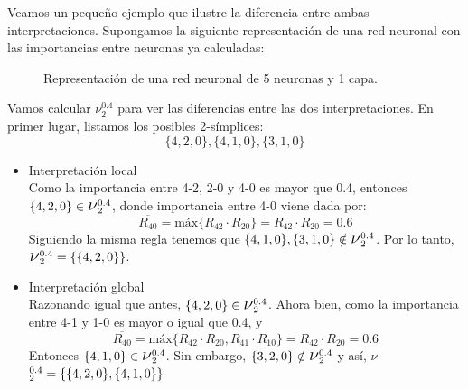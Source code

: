 \documentclass[12pt, a4paper, twoside]{book}
\numberwithin{equation}{section}
\theoremstyle{definition}
\newenvironment{ejem}
  {\pushQED{\qed}\renewcommand{\qedsymbol}{$\blacktriangleleft$}\ejemplo}
  {\popQED\endejemplo}
\theoremstyle{remark}
\theoremstyle{plain}
\begin{document}
	Veamos un pequeño ejemplo que ilustre la diferencia entre ambas 
	interpretaciones.
	\begin{ejem}
		\label{ej:int}
		Supongamos la siguiente representación de una red neuronal con 
		las importancias entre neuronas ya calculadas: 	
		\begin{figure}[H]
			\centering
			\caption{Representación de una red neuronal de 5 neuronas y 1 capa.}
		\end{figure}
		Vamos calcular {\Large $\nu$}$^{0.4}_{2}$ para ver las 
		diferencias entre las dos interpretaciones. En primer lugar, 
		listamos los posibles 2-símplices: 
		$$
		\{4,2,0\},\{4,1,0\},\{3,1,0\}
		$$
		\begin{itemize}
			\item{Interpretación local}\\
				Como la importancia entre 4-2, 2-0 y 4-0 es 
				mayor que 0.4, entonces $\{4,2,0\} \in 
				\text{{\Large $\nu$}}^{0.4}_{2}$,
				donde importancia entre 4-0 viene dada por:
				$$\overline{R_{40}}=\text{máx}\{R_{42} \cdot 
				R_{20}\}=R_{42} \cdot R_{20}=0.6$$
				Siguiendo la misma regla tenemos que 
				$\{4,1,0\},\{3,1,0\} \notin 
				\text{{\Large $\nu$}}^{0.4}_{2}$. Por lo 
				tanto,
				$\text{{\Large $\nu$}}^{0.4}_{2}=
				\{\{4,2,0\}\}$.
			\item{Interpretación global}\\
				Razonando igual que antes,$\ \{4,2,0\} \in 
				\text{{\Large $\nu$}}^{0.4}_{2}$. Ahora bien, 
				como la importancia entre 4-1 y 1-0 es mayor o 
				igual que 0.4, y 
				$$\overline{R_{40}}=\text{máx}\{R_{42} \cdot 
				R_{20},R_{41} \cdot R_{10}\}=R_{42} \cdot 
				R_{20}=0.6$$ 
				Entonces $\{4,1,0\} \in 
				\text{{\Large $\nu$}}^{0.4}_{2}$. Sin embargo, 
				$\{3,2,0\} \notin 
				\text{{\Large $\nu$}}^{0.4}_{2}$ y así, 
				{\Large $\nu$}$^{0.4}_{2}=\{\{4,2,0\},\\  
				\{4,1,0\}\}$
		\end{itemize}
	\end{ejem}
\end{document}
